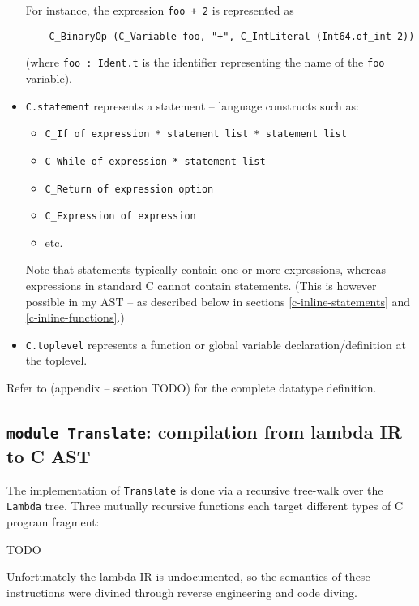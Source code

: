 \documentclass[12pt,a4paper,twoside,openright]{report}
\begin{document}
\begin{itemize}
    For instance, the expression \lstinline!foo + 2! is represented as
    \begin{lstlisting}
    C_BinaryOp (C_Variable foo, "+", C_IntLiteral (Int64.of_int 2))\end{lstlisting}%
    (where \lstinline!foo : Ident.t! is the identifier representing the name of the
    \lstinline!foo! variable).

	\item
		\lstinline!C.statement! represents a statement -- language constructs such as:

        \begin{itemize}
            \item \lstinline!C_If of expression * statement list * statement list!
            \item \lstinline!C_While of expression * statement list!
            \item \lstinline!C_Return of expression option!
            \item \lstinline!C_Expression of expression!
            \item etc.
        \end{itemize}
        Note that statements typically contain one or more expressions, whereas
        expressions in standard C cannot contain statements. (This is however
        possible in my AST -- as described below in sections \ref{c-inline-statements} and \ref{c-inline-functions}.)

	\item
		\lstinline!C.toplevel! represents a function or global variable declaration/definition at the toplevel.
\end{itemize}

Refer to (appendix -- section TODO) for the complete datatype definition.

\subsection{\texttt{module Translate}: compilation from lambda IR to C AST}

The implementation of \lstinline!Translate! is done via a recursive tree-walk
over the \lstinline!Lambda! tree. Three mutually recursive functions each
target different types of C program fragment:

TODO

Unfortunately the lambda IR is undocumented, so the semantics
of these instructions were divined through reverse engineering and code diving.
\end{document}
